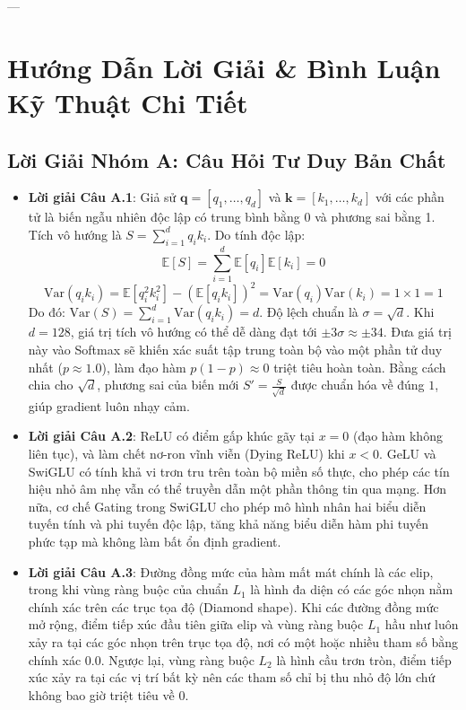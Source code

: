---

\section{Hướng Dẫn Lời Giải \& Bình Luận Kỹ Thuật Chi Tiết}
\label{sec:ch04-solutions}

\subsection{Lời Giải Nhóm A: Câu Hỏi Tư Duy Bản Chất}
\begin{itemize}
  \item \textbf{Lời giải Câu A.1}:
  Giả sử $\mathbf{q} = [q_1, \dots, q_d]$ và $\mathbf{k} = [k_1, \dots, k_d]$ với các phần tử là biến ngẫu nhiên độc lập có trung bình bằng 0 và phương sai bằng 1. Tích vô hướng là $S = \sum_{i=1}^d q_i k_i$. Do tính độc lập:
  \begin{equation*}
  \mathbb{E}[S] = \sum_{i=1}^d \mathbb{E}[q_i]\mathbb{E}[k_i] = 0
  \end{equation*}
  \begin{equation*}
  \text{Var}(q_i k_i) = \mathbb{E}[q_i^2 k_i^2] - (\mathbb{E}[q_i k_i])^2 = \text{Var}(q_i)\text{Var}(k_i) = 1 \times 1 = 1
  \end{equation*}
  Do đó: $\text{Var}(S) = \sum_{i=1}^d \text{Var}(q_i k_i) = d$. Độ lệch chuẩn là $\sigma = \sqrt{d}$.
  Khi $d = 128$, giá trị tích vô hướng có thể dễ dàng đạt tới $\pm 3\sigma \approx \pm 34$. Đưa giá trị này vào Softmax sẽ khiến xác suất tập trung toàn bộ vào một phần tử duy nhất ($p \approx 1.0$), làm đạo hàm $p(1 - p) \approx 0$ triệt tiêu hoàn toàn. Bằng cách chia cho $\sqrt{d}$, phương sai của biến mới $S' = \frac{S}{\sqrt{d}}$ được chuẩn hóa về đúng $1$, giúp gradient luôn nhạy cảm.

  \item \textbf{Lời giải Câu A.2}:
  ReLU có điểm gấp khúc gãy tại $x = 0$ (đạo hàm không liên tục), và làm chết nơ-ron vĩnh viễn (Dying ReLU) khi $x < 0$. GeLU và SwiGLU có tính khả vi trơn tru trên toàn bộ miền số thực, cho phép các tín hiệu nhỏ âm nhẹ vẫn có thể truyền dẫn một phần thông tin qua mạng. Hơn nữa, cơ chế Gating trong SwiGLU cho phép mô hình nhân hai biểu diễn tuyến tính và phi tuyến độc lập, tăng khả năng biểu diễn hàm phi tuyến phức tạp mà không làm bất ổn định gradient.

  \item \textbf{Lời giải Câu A.3}:
  Đường đồng mức của hàm mất mát chính là các elip, trong khi vùng ràng buộc của chuẩn $L_1$ là hình đa diện có các góc nhọn nằm chính xác trên các trục tọa độ (Diamond shape). Khi các đường đồng mức mở rộng, điểm tiếp xúc đầu tiên giữa elip và vùng ràng buộc $L_1$ hầu như luôn xảy ra tại các góc nhọn trên trục tọa độ, nơi có một hoặc nhiều tham số bằng chính xác $0.0$. Ngược lại, vùng ràng buộc $L_2$ là hình cầu trơn tròn, điểm tiếp xúc xảy ra tại các vị trí bất kỳ nên các tham số chỉ bị thu nhỏ độ lớn chứ không bao giờ triệt tiêu về $0$.


\end{itemize}
